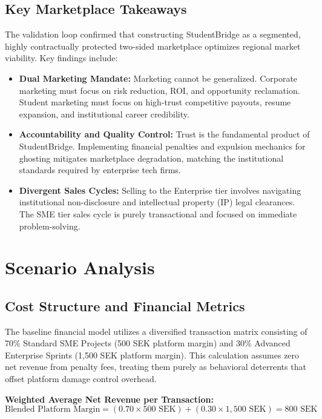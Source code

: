 \documentclass[12pt,a4paper]{article}
\begin{document}
\subsection{Key Marketplace Takeaways}
The validation loop confirmed that constructing StudentBridge as a segmented, highly contractually protected two-sided marketplace optimizes regional market viability. Key findings include:
\begin{itemize}
    \item \textbf{Dual Marketing Mandate:} Marketing cannot be generalized. Corporate marketing must focus on risk reduction, ROI, and opportunity reclamation. Student marketing must focus on high-trust competitive payouts, resume expansion, and institutional career credibility.
    \item \textbf{Accountability and Quality Control:} Trust is the fundamental product of StudentBridge. Implementing financial penalties and expulsion mechanics for ghosting mitigates marketplace degradation, matching the institutional standards required by enterprise tech firms.
    \item \textbf{Divergent Sales Cycles:} Selling to the Enterprise tier involves navigating institutional non-disclosure and intellectual property (IP) legal clearances. The SME tier sales cycle is purely transactional and focused on immediate problem-solving.
\end{itemize}

\section{Scenario Analysis}

\subsection{Cost Structure and Financial Metrics}

The baseline financial model utilizes a diversified transaction matrix consisting of 70\% Standard SME Projects (500 SEK platform margin) and 30\% Advanced Enterprise Sprints (1,500 SEK platform margin). This calculation assumes zero net revenue from penalty fees, treating them purely as behavioral deterrents that offset platform damage control overhead.

\textbf{Weighted Average Net Revenue per Transaction:}
\[
  \text{Blended Platform Margin} = (0.70 \times 500\text{ SEK}) + (0.30 \times 1,500\text{ SEK}) = 800\text{ SEK}
\]
\end{document}
